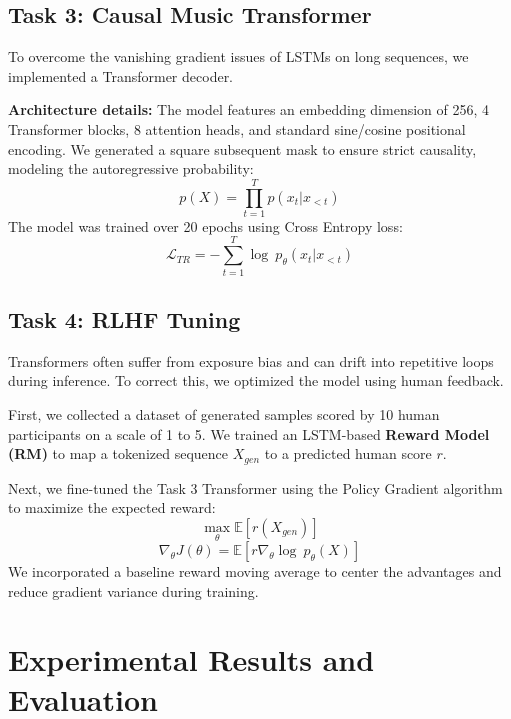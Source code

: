 \documentclass[conference]{IEEEtran}
\begin{document}
\subsection{Task 3: Causal Music Transformer}
To overcome the vanishing gradient issues of LSTMs on long sequences, we implemented a Transformer decoder.

\textbf{Architecture details:} The model features an embedding dimension of 256, 4 Transformer blocks, 8 attention heads, and standard sine/cosine positional encoding. We generated a square subsequent mask to ensure strict causality, modeling the autoregressive probability:
\begin{equation}
p(X)=\prod_{t=1}^{T}p(x_{t}|x_{<t})
\end{equation}
The model was trained over 20 epochs using Cross Entropy loss:
\begin{equation}
\mathcal{L}_{TR}=-\sum_{t=1}^{T}\log~p_{\theta}(x_{t}|x_{<t})
\end{equation}

\subsection{Task 4: RLHF Tuning}
Transformers often suffer from exposure bias and can drift into repetitive loops during inference. To correct this, we optimized the model using human feedback. 

First, we collected a dataset of generated samples scored by 10 human participants on a scale of 1 to 5. We trained an LSTM-based \textbf{Reward Model (RM)} to map a tokenized sequence $X_{gen}$ to a predicted human score $r$.

Next, we fine-tuned the Task 3 Transformer using the Policy Gradient algorithm to maximize the expected reward:
\begin{equation}
\max_{\theta}\mathbb{E}[r(X_{gen})]
\end{equation}
\begin{equation}
\nabla_{\theta}J(\theta)=\mathbb{E}[r\nabla_{\theta}\log~p_{\theta}(X)]
\end{equation}
We incorporated a baseline reward moving average to center the advantages and reduce gradient variance during training.



\section{Experimental Results and Evaluation}
\end{document}
